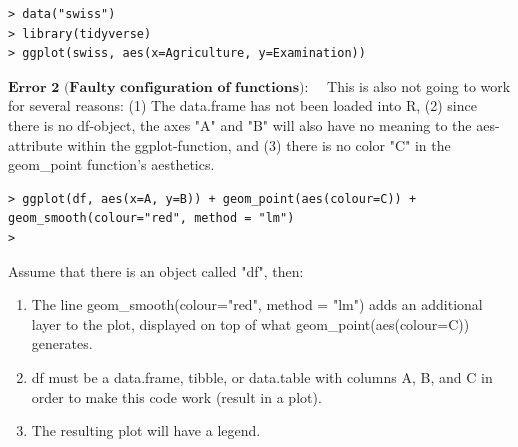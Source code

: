\documentclass[10pt,a4paper]{article}
\begin{document}
\vspace{0.5em}

\begin{lstlisting}
> data("swiss")
> library(tidyverse)
> ggplot(swiss, aes(x=Agriculture, y=Examination))
\end{lstlisting}

\vspace{0.5em}

$\textbf{Error 2 (Faulty configuration of functions):} \quad$ This is also not going to work for several reasons: (1) The data.frame has not been loaded into R, (2) since there is no df-object, the axes "A" and "B" will also have no meaning to the aes-attribute within the ggplot-function, and (3) there is no color "C" in the geom\_point function's aesthetics.

\vspace{0.5em}

\begin{lstlisting}
> ggplot(df, aes(x=A, y=B)) + geom_point(aes(colour=C)) + geom_smooth(colour="red", method = "lm")
>
\end{lstlisting}

\vspace{0.5em}

Assume that there is an object called "df", then:

\begin{enumerate}
\item The line geom\_smooth(colour="red", method = "lm") adds an additional layer to the plot, displayed
on top of what geom\_point(aes(colour=C)) generates.
\item df must be a data.frame, tibble, or data.table with columns A, B, and C in order to make this code
work (result in a plot).
\item The resulting plot will have a legend.
\end{enumerate}
\end{document}
